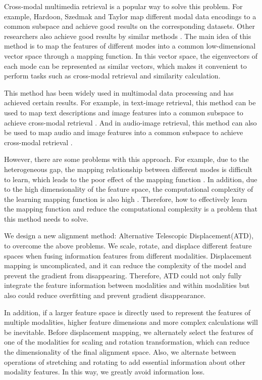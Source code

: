 \documentclass{ecai}
\begin{document}
 Cross-modal multimedia retrieval is a popular way to solve this problem. For example, Hardoon, Szedmak and Taylor \cite{hardoon_canonical_2004} map different modal data encodings to a common subspace and achieve good results on the corresponding datasets. Other researchers also achieve good results by similar methods \cite{peng_modality-specific_2018-1} \cite{chen_cross-modal_2022}. The main idea of this method is to map the features of different modes into a common low-dimensional vector space through a mapping function. In this vector space, the eigenvectors of each mode can be represented as similar vectors, which makes it convenient to perform tasks such as cross-modal retrieval and similarity calculation.

 This method has been widely used in multimodal data processing and has achieved certain results. For example, in text-image retrieval, this method can be used to map text descriptions and image features into a common subspace to achieve cross-modal retrieval \cite{cho_unifying_2021}. And in audio-image retrieval, this method can also be used to map audio and image features into a common subspace to achieve cross-modal retrieval \cite{yang2022multimodal} \cite{yuan2022exploring} \cite{zhang2007cross}.


 However, there are some problems with this approach. For example, due to the heterogeneous gap, the mapping relationship between different modes is difficult to learn, which leads to the poor effect of the mapping function \cite{guo_deep_2019}. In addition, due to the high dimensionality of the feature space, the computational complexity of the learning mapping function is also high \cite{houle_can_2010}. Therefore, how to effectively learn the mapping function and reduce the computational complexity is a problem that this method needs to solve.


We design a new alignment method: Alternative Telescopic Displacement(ATD), to overcome the above problems. We scale, rotate, and displace different feature spaces when fusing information features from different modalities. Displacement mapping is uncomplicated, and it can reduce the complexity of the model and prevent the gradient from disappearing.  Therefore, ATD could not only fully integrate the feature information between modalities and within modalities but also could reduce overfitting and prevent gradient disappearance. 

In addition, if a larger feature space is directly used to represent the features of multiple modalities, higher feature dimensions and more complex calculations will be inevitable. Before displacement mapping, we alternately select the features of one of the modalities for scaling and rotation transformation, which can reduce the dimensionality of the final alignment space. Also, we alternate between operations of stretching and rotating to add essential information about other modality features. In this way, we greatly avoid information loss.
\end{document}
